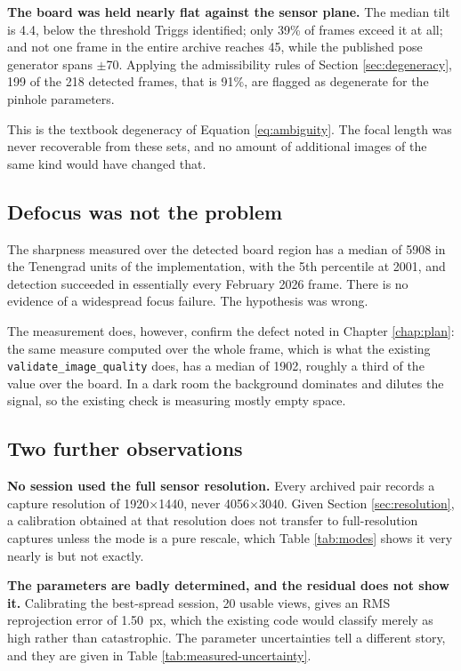\textbf{The board was held nearly flat against the sensor plane.} The median tilt is 4.4\textdegree, below the threshold Triggs identified; only 39\% of frames exceed it at all; and not one frame in the entire archive reaches 45\textdegree, while the published pose generator spans $\pm$70\textdegree. Applying the admissibility rules of Section \ref{sec:degeneracy}, 199 of the 218 detected frames, that is 91\%, are flagged as degenerate for the pinhole parameters.

This is the textbook degeneracy of Equation \ref{eq:ambiguity}. The focal length was never recoverable from these sets, and no amount of additional images of the same kind would have changed that.

\subsection{Defocus was not the problem}

The sharpness measured over the detected board region has a median of 5908 in the Tenengrad units of the implementation, with the 5th percentile at 2001, and detection succeeded in essentially every February 2026 frame. There is no evidence of a widespread focus failure. The hypothesis was wrong.

The measurement does, however, confirm the defect noted in Chapter \ref{chap:plan}: the same measure computed over the whole frame, which is what the existing \texttt{validate\_image\_quality} does, has a median of 1902, roughly a third of the value over the board. In a dark room the background dominates and dilutes the signal, so the existing check is measuring mostly empty space.

\subsection{Two further observations}

\textbf{No session used the full sensor resolution.} Every archived pair records a capture resolution of 1920$\times$1440, never 4056$\times$3040. Given Section \ref{sec:resolution}, a calibration obtained at that resolution does not transfer to full-resolution captures unless the mode is a pure rescale, which Table \ref{tab:modes} shows it very nearly is but not exactly.

\textbf{The parameters are badly determined, and the residual does not show it.} Calibrating the best-spread session, 20 usable views, gives an RMS reprojection error of 1.50~px, which the existing code would classify merely as high rather than catastrophic. The parameter uncertainties tell a different story, and they are given in Table \ref{tab:measured-uncertainty}.

